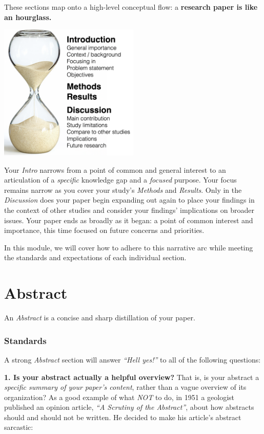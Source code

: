 \documentclass[
]{book}
\begin{document}
These sections map onto a high-level conceptual flow: a \textbf{research paper is like an hourglass.}

\includegraphics[width=0.5\textwidth,height=\textheight]{img/hourglass.png}

Your \emph{Intro} narrows from a point of common and general interest to an articulation of a \emph{specific} knowledge gap and a \emph{focused} purpose. Your focus remains narrow as you cover your study's \emph{Methods} and \emph{Results}. Only in the \emph{Discussion} does your paper begin expanding out again to place your findings in the context of other studies and consider your findings' implications on broader issues. Your paper ends as broadly as it began: a point of common interest and importance, this time focused on future concerns and priorities.

In this module, we will cover how to adhere to this narrative arc while meeting the standards and expectations of each individual section.

\hypertarget{abstract}{%
\section*{Abstract}\label{abstract}}

An \emph{Abstract} is a concise and sharp distillation of your paper.

\hypertarget{standards}{%
\subsubsection*{Standards}\label{standards}}

A strong \emph{Abstract} section will answer \emph{``Hell yes!''} to all of the following questions:

\textbf{1. Is your abstract actually a helpful overview?} That is, is your abstract a \emph{specific summary of your paper's content}, rather than a vague overview of its organization? As a good example of what \emph{NOT} to do, in 1951 a geologist published an opinion article, \emph{``A Scrutiny of the Abstract''}, about how abstracts should and should not be written. He decided to make his article's abstract sarcastic:
\end{document}
